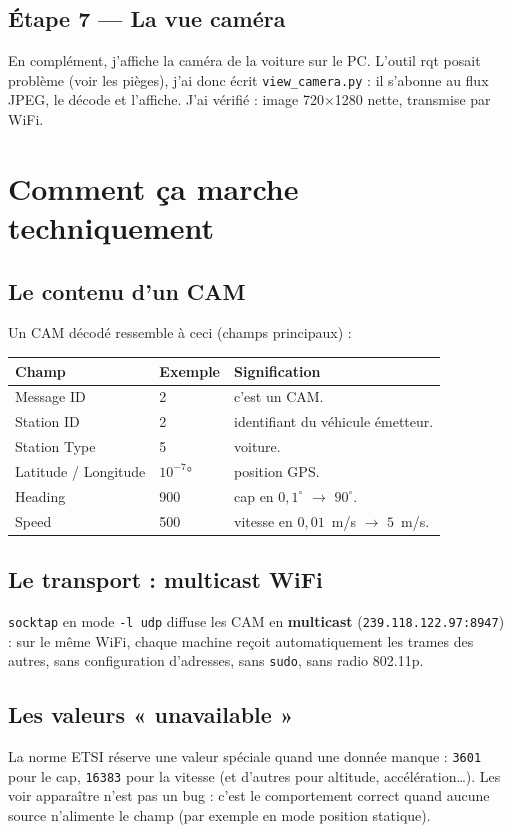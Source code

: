 \documentclass[a4paper,11pt]{article}
\newcommand{\code}[1]{\texttt{#1}}
\begin{document}
\subsection{Étape 7 --- La vue caméra}
En complément, j'affiche la caméra de la voiture sur le PC. L'outil rqt posait problème (voir
les pièges), j'ai donc écrit \code{view\_camera.py} : il s'abonne au flux JPEG, le décode et
l'affiche. J'ai vérifié : image 720$\times$1280 nette, transmise par WiFi.

\section{Comment ça marche techniquement}

\subsection{Le contenu d'un CAM}
Un CAM décodé ressemble à ceci (champs principaux) :
\begin{center}
\begin{tabularx}{\textwidth}{@{}l l X@{}}
\toprule
\textbf{Champ} & \textbf{Exemple} & \textbf{Signification} \\
\midrule
Message ID & 2 & c'est un CAM. \\
Station ID & 2 & identifiant du véhicule émetteur. \\
Station Type & 5 & voiture. \\
Latitude / Longitude & $10^{-7}$° & position GPS. \\
Heading & 900 & cap en $0{,}1^\circ$ $\rightarrow$ $90^\circ$. \\
Speed & 500 & vitesse en $0{,}01$~m/s $\rightarrow$ $5$~m/s. \\
\bottomrule
\end{tabularx}
\end{center}

\subsection{Le transport : multicast WiFi}
\code{socktap} en mode \code{-l udp} diffuse les CAM en \textbf{multicast}
(\code{239.118.122.97:8947}) : sur le même WiFi, chaque machine reçoit automatiquement les
trames des autres, sans configuration d'adresses, sans \code{sudo}, sans radio 802.11p.

\subsection{Les valeurs « unavailable »}
La norme ETSI réserve une valeur spéciale quand une donnée manque : \code{3601} pour le cap,
\code{16383} pour la vitesse (et d'autres pour altitude, accélération\ldots). Les voir
apparaître n'est pas un bug : c'est le comportement correct quand aucune source n'alimente le
champ (par exemple en mode position statique).
\end{document}

